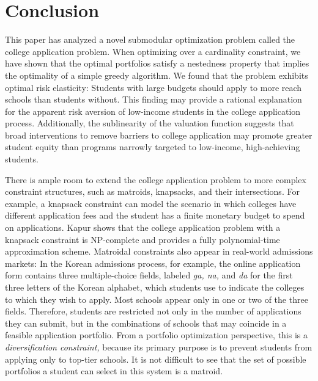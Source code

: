 \section{Conclusion} \label{sectionConclusion}

This paper has analyzed a novel submodular optimization problem called the college application problem. When optimizing over a cardinality constraint, we have shown that the optimal portfolios satisfy a nestedness property that implies the optimality of a simple greedy algorithm. We found that the problem exhibits optimal risk elasticity: Students with large budgets should apply to more reach schools than students without. This finding may provide a rational explanation for the apparent risk aversion of low-income students in the college application process. Additionally, the sublinearity of the valuation function suggests that broad interventions to remove barriers to college application may promote greater student equity than programs narrowly targeted to low-income, high-achieving students.

There is ample room to extend the college application problem to more complex constraint structures, such as matroids, knapsacks, and their intersections. For example, a knapsack constraint can model the scenario in which colleges have different application fees and the student has a finite monetary budget to spend on applications. Kapur \cite{kapur2022} shows that the college application problem with a knapsack constraint is NP-complete and provides a fully polynomial-time approximation scheme. Matroidal constraints also appear in real-world admissions markets: In the Korean admissions process, for example, the online application form contains three multiple-choice fields, labeled \emph{ga, na,} and \emph{da} for the first three letters of the Korean alphabet, which students use to indicate the colleges to which they wish to apply. Most schools appear only in one or two of the three fields. Therefore, students are restricted not only in the number of applications they can submit, but in the combinations of schools that may coincide in a feasible application portfolio. From a portfolio optimization perspective, this is a \emph{diversification constraint,} because its primary purpose is to prevent students from applying only to top-tier schools. It is not difficult to see that the set of possible portfolios a student can select in this system is a matroid.


